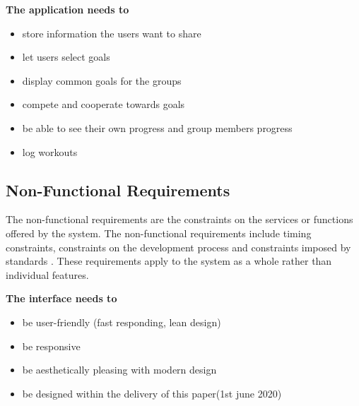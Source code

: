 \textbf{The application needs to}
\begin{itemize}
\item store information the users want to share
\item let users select goals
\item display common goals for the groups
\item compete and cooperate towards goals
\item be able to see their own progress and group members progress
\item log workouts

\end{itemize}
    
\subsection{Non-Functional Requirements}
The non-functional requirements are the constraints on the services or functions offered by the system. The non-functional requirements include timing constraints, constraints on the development process and constraints imposed by standards \cite{Sommerville:2010:SE:1841764} . These requirements apply to the system as a whole rather than individual features. 

\textbf{The interface needs to}
\begin{itemize}
\item be user-friendly (fast responding, lean design)
\item be responsive
\item be aesthetically pleasing with modern design
\item be designed within the delivery of this paper(1st june 2020)
\end{itemize}
    